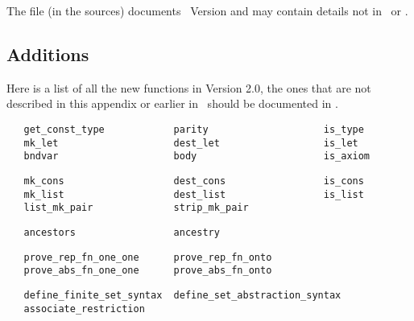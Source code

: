 \noindent The file  (in the sources) documents \HOL\ 
Version  and may contain details not in \DESCRIPTION\ or
\REFERENCE.

\subsection{Additions}

Here is a list of all the new functions in Version 2.0, the ones that
are not described in this appendix or earlier in \DESCRIPTION\ should be
documented in \REFERENCE.

\begin{hol}\begin{verbatim}
   get_const_type            parity                    is_type
   mk_let                    dest_let                  is_let
   bndvar                    body                      is_axiom   
\end{verbatim}\end{hol}
\begin{hol}\begin{verbatim}
   mk_cons                   dest_cons                 is_cons
   mk_list                   dest_list                 is_list
   list_mk_pair              strip_mk_pair
\end{verbatim}\end{hol}
\begin{hol}\begin{verbatim}
   ancestors                 ancestry
\end{verbatim}\end{hol}
\begin{hol}\begin{verbatim}
   prove_rep_fn_one_one      prove_rep_fn_onto       
   prove_abs_fn_one_one      prove_abs_fn_onto 
\end{verbatim}\end{hol}
\begin{hol}\begin{verbatim}
   define_finite_set_syntax  define_set_abstraction_syntax
   associate_restriction
\end{verbatim}\end{hol}
